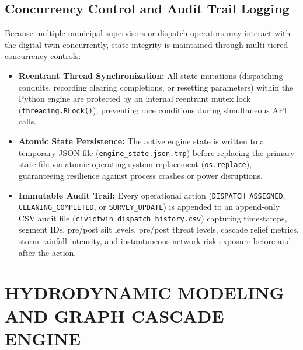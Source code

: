 \documentclass[12pt,a4paper]{report}
\begin{document}
\section{Concurrency Control and Audit Trail Logging}
Because multiple municipal supervisors or dispatch operators may interact with the digital twin concurrently, state integrity is maintained through multi-tiered concurrency controls:
\begin{itemize}
    \item \textbf{Reentrant Thread Synchronization:} All state mutations (dispatching conduits, recording clearing completions, or resetting parameters) within the Python engine are protected by an internal reentrant mutex lock (\texttt{threading.RLock()}), preventing race conditions during simultaneous API calls.
    \item \textbf{Atomic State Persistence:} The active engine state is written to a temporary JSON file (\texttt{engine\_state.json.tmp}) before replacing the primary state file via atomic operating system replacement (\texttt{os.replace}), guaranteeing resilience against process crashes or power disruptions.
    \item \textbf{Immutable Audit Trail:} Every operational action (\texttt{DISPATCH\_ASSIGNED}, \texttt{CLEANING\_COMPLETED}, or \texttt{SURVEY\_UPDATE}) is appended to an append-only CSV audit file (\texttt{civictwin\_dispatch\_history.csv}) capturing timestamps, segment IDs, pre/post silt levels, pre/post threat levels, cascade relief metrics, storm rainfall intensity, and instantaneous network risk exposure before and after the action.
\end{itemize}


\chapter{HYDRODYNAMIC MODELING AND GRAPH CASCADE ENGINE}
\end{document}
